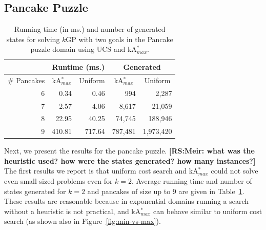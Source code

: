 \documentclass{aicom2e}
\newcommand{\kgs}{$k$GP}
\newcommand{\kastarmax}{kA$^*_{max}$}
\newcommand{\roni}[1]{\textbf{[RS:#1]}}
\begin{document}
\subsection{Pancake Puzzle}

\begin{table}[]
    \centering
    \begin{tabular}{|r|r|r|r|r|}
    \hline
        \multicolumn{1}{|l|}{}            & \multicolumn{2}{c|}{Runtime (ms.)}                                       & \multicolumn{2}{c|}{Generated} \\ \hline
        \multicolumn{1}{|c|}{\# Pancakes} & \multicolumn{1}{c}{\kastarmax{}} & \multicolumn{1}{c|}{Uniform} & \multicolumn{1}{c}{\kastarmax{}} & \multicolumn{1}{c|}{Uniform} \\ \hline
        6                               & 0.34                                      & 0.46                        & 994                                       & 2,287                       \\
        7                               & 2.57                                      & 4.06                        & 8,617                                     & 21,059                      \\
        8                               & 22.95                                     & 40.25                       & 74,745                                    & 188,946                     \\
        9                               & 410.81                                    & 717.64                      & 787,481                                   &
        1,973,420\\
        \hline
    \end{tabular}
    \caption{Running time (in ms.) and number of generated states for solving \kgs{} with two goals
        in the Pancake puzzle domain using UCS and \kastarmax{}.}
\label{tab:pancake-max-uniform}
\end{table}

Next, we present the results for the pancake puzzle.
\roni{Meir: what was the heuristic used? how were the states generated? how many instances?}
The first results we report is that uniform cost search and \kastarmax{}
could not solve even small-sized problems even for $k=2$. Average running time and number of states generated  for $k=2$ and pancakes of size up to 9 are given in Table~\ref{tab:pancake-max-uniform}. These results are reasonable because in exponential domains running a search without a heuristic is not practical, and \kastarmax{} can behave similar to uniform cost search (as shown also in Figure~\ref{fig:min-vs-max}).
\end{document}
